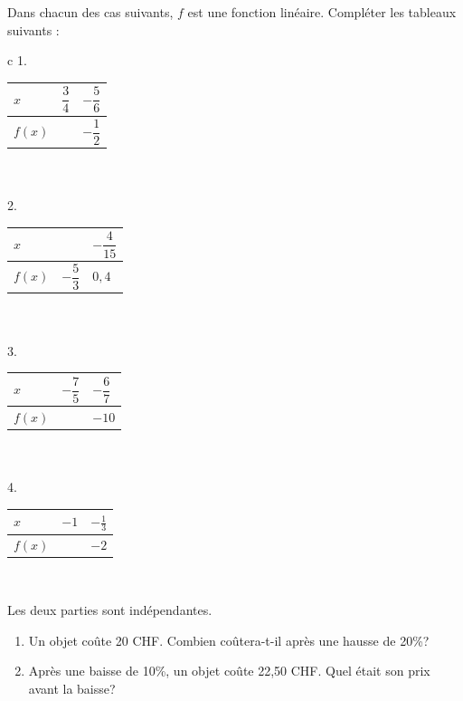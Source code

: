 \begin{exercice}
Dans chacun des cas suivants, $f$ est une fonction linéaire. Compléter les tableaux suivants : \\
\begin{tabular}{c}
\renewcommand{\arraystretch}{2}
1. \begin{tabular}{|p{2cm}|p{1.2cm}|p{1.1cm}|}
 \hline
$x$&$\dfrac{3}{4}$&$-\dfrac{5}{6}$\\\hline
$f(x)$&&$-\dfrac{1}{2}$\\\hline
 \end{tabular}\\\\
\renewcommand{\arraystretch}{2}
2. \begin{tabular}{|p{2cm}|p{1.2cm}|p{1.1cm}|}
 \hline
$x$&&$-\dfrac{4}{15}$\\\hline
$f(x)$&$-\dfrac{5}{3}$&$0,4$\\\hline
 \end{tabular}\\\\
\renewcommand{\arraystretch}{2}
3. \begin{tabular}{|p{2cm}|p{1.2cm}|p{1.1cm}|}
 \hline
$x$&$-\dfrac{7}{5}$&$-\dfrac{6}{7}$\\\hline
$f(x)$&&$-10$\\\hline
 \end{tabular}\\\\
\renewcommand{\arraystretch}{2}
4. \begin{tabular}{|p{2cm}|p{1.2cm}|p{1.1cm}|}
 \hline
$x$&$-1$&$-\frac{1}{3}$\\\hline
$f(x)$&&$-2$\\\hline
 \end{tabular}\\
\end{tabular}
\end{exercice}

\begin{exercice}
Les deux parties sont indépendantes.\\
\begin{enumerate}
\item Un objet coûte 20 CHF. Combien coûtera-t-il après une hausse de 20\%?
\item Après une baisse de 10\%, un objet coûte 22,50 CHF. Quel était son prix avant la baisse?
\end{enumerate}
\end{exercice}

